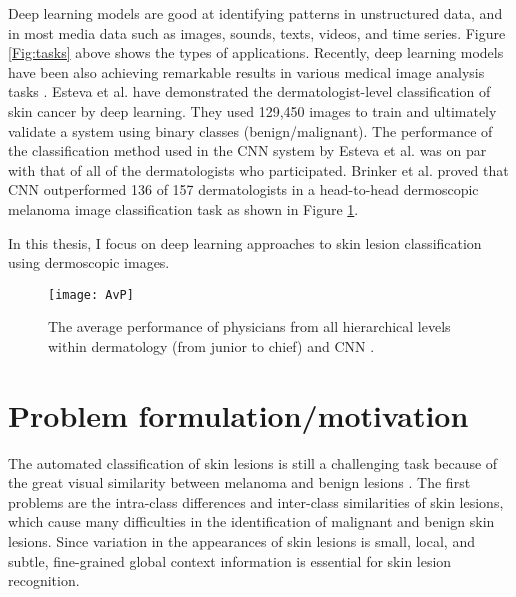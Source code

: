 Deep learning models are good at identifying patterns in unstructured data, and in most  media data such as images, sounds, texts, videos, and time series. Figure \ref{Fig:tasks} above shows the types of applications. Recently, deep learning models have been also achieving remarkable results in various medical image analysis tasks \cite{yu2016automated,lin2020comparison,eskandari2022frailty,azeem2021covid,romo2020end}. Esteva et al. \cite{esteva2017dermatologist} have demonstrated the dermatologist-level classification of skin cancer by deep learning. They used 129,450 images to train and ultimately validate a system using binary classes (benign/malignant). The performance of the classification method used in the CNN system by Esteva et al. \cite{esteva2017dermatologist} was on par with that of all of the dermatologists who participated. Brinker et al. \cite{brinker2019deep} proved that CNN outperformed 136 of 157 dermatologists in a head-to-head dermoscopic melanoma image classification task as shown in Figure \ref{Fig:CNNP}. 

In this thesis, I focus on deep learning approaches to skin lesion classification using
dermoscopic images.

\begin{figure}[!h]
\centering
	\texttt{[image: AvP]}
		\caption{The average performance of physicians from all hierarchical levels within dermatology (from junior to chief) and CNN \cite{brinker2019deep}.}
		\label{Fig:CNNP} 
\end{figure}



\section{Problem formulation/motivation}
 The automated classification of skin lesions is still a challenging task because of the great visual similarity between melanoma and benign lesions \cite{hosny2022refined}. The first problems are the intra-class differences and inter-class similarities of skin lesions, which cause many difficulties in the identification of malignant and benign skin lesions. Since variation in the appearances of skin lesions  is small, local, and subtle, fine-grained global context information is essential for skin lesion recognition.                                                                                     

